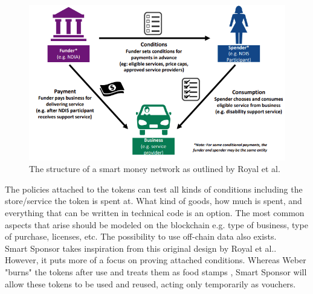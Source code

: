 \begin{figure}[H]
    \centering
    \includegraphics[scale=0.7]{figures/smart_money_network.PNG}  
    \caption{The structure of a smart money network as outlined by Royal et al.\cite{royal}}
    \label{fig:my_label}
\end{figure}
The policies attached to the tokens can test all kinds of conditions including the store/service the token is spent at. What kind of goods, how much is spent, and everything that can be written in technical code is an option. The most common aspects that arise should be modeled on the blockchain e.g. type of business, type of purchase, licenses, etc. The possibility to use off-chain data also exists.\\
Smart Sponsor takes inspiration from this original design by Royal et al.\cite{royal}. However, it puts more of a focus on proving attached conditions. Whereas Weber "burns" the tokens after use and treats them as food stamps \cite{weber}\cite{pattern}, Smart Sponsor will allow these tokens to be used and reused, acting only temporarily as vouchers.